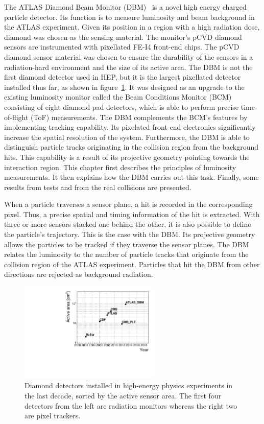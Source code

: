 The ATLAS Diamond Beam Monitor (DBM)~\cite{} is a novel high energy charged particle detector. Its function is to measure luminosity and beam background in the ATLAS experiment. Given its position in a region with a high radiation dose, diamond was chosen as the sensing material. The monitor's pCVD diamond sensors are instrumented with pixellated FE-I4 front-end chips. The pCVD diamond sensor material was chosen to ensure the durability of the sensors in a radiation-hard environment and the size of its active area. The DBM is not the first diamond detector used in HEP, but it is the largest pixellated detector installed thus far, as shown in figure~\ref{fig:areavsyear}. It was designed as an upgrade to the existing luminosity monitor called the Beam Conditions Monitor (BCM)~\cite{} consisting of eight diamond pad detectors, which is able to perform precise time-of-flight (ToF) measurements. The DBM complements the BCM's features by implementing tracking capability. Its pixelated front-end electronics significantly increase the spatial resolution of the system. Furthermore, the DBM is able to distinguish particle tracks originating in the collision region from the background hits. This capability is a result of its projective geometry pointing towards the interaction region. This chapter first describes the principles of luminosity measurements. It then explains how the DBM carries out this task. Finally, some results from tests and from the real collisions are presented. 

When a particle traverses a sensor plane, a hit is recorded in the corresponding pixel. Thus, a precise spatial and timing information of the hit is extracted. With three or more sensors stacked one behind the other, it is also possible to define the particle's trajectory. This is the case with the DBM. Its projective geometry allows the particles to be tracked if they traverse the sensor planes. The DBM relates the luminosity to the number of particle tracks that originate from the collision region of the ATLAS experiment. Particles that hit the DBM from other directions are rejected as background radiation.

\begin{figure}[!t]
\centering
\includegraphics[width=0.6\textwidth]{../scripts/04_charge_monitoring/plots/detArea}
\caption{Diamond detectors installed in high-energy physics experiments in the last decade, sorted by the active sensor area. The first four detectors from the left are radiation monitors whereas the right two are pixel trackers.}
\label{fig:areavsyear}
\end{figure}

